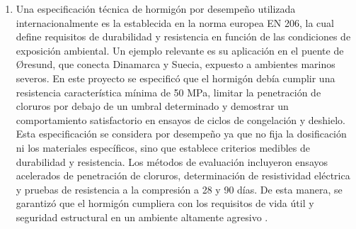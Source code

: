 \begin{enumerate}
    \item Una especificación técnica de hormigón por desempeño utilizada internacionalmente es la establecida en la norma europea EN 206, la cual define requisitos de durabilidad y resistencia en función de las condiciones de exposición ambiental. Un ejemplo relevante es su aplicación en el puente de Øresund, que conecta Dinamarca y Suecia, expuesto a ambientes marinos severos. En este proyecto se especificó que el hormigón debía cumplir una resistencia característica mínima de 50 MPa, limitar la penetración de cloruros por debajo de un umbral determinado y demostrar un comportamiento satisfactorio en ensayos de ciclos de congelación y deshielo. Esta especificación se considera por desempeño ya que no fija la dosificación ni los materiales específicos, sino que establece criterios medibles de durabilidad y resistencia. Los métodos de evaluación incluyeron ensayos acelerados de penetración de cloruros, determinación de resistividad eléctrica y pruebas de resistencia a la compresión a 28 y 90 días. De esta manera, se garantizó que el hormigón cumpliera con los requisitos de vida útil y seguridad estructural en un ambiente altamente agresivo \citep{EN206,ConcreteSociety2010}.
\end{enumerate}




































